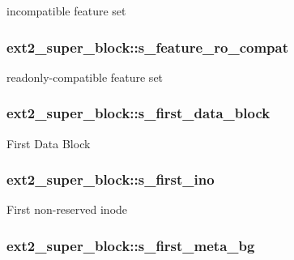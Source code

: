 incompatible feature set \hypertarget{structext2__super__block_a9c63e7954f0344d3de19aad4099d84c7}{
\subsubsection[{s\-\_\-feature\-\_\-ro\-\_\-compat}]{ ext2\-\_\-super\-\_\-block\-::s\-\_\-feature\-\_\-ro\-\_\-compat}}\label{structext2__super__block_a9c63e7954f0344d3de19aad4099d84c7}
readonly-\/compatible feature set \hypertarget{structext2__super__block_ab7c5dfba6eafbb1974f7628d4ae32601}{
\subsubsection[{s\-\_\-first\-\_\-data\-\_\-block}]{ ext2\-\_\-super\-\_\-block\-::s\-\_\-first\-\_\-data\-\_\-block}}\label{structext2__super__block_ab7c5dfba6eafbb1974f7628d4ae32601}
First Data Block \hypertarget{structext2__super__block_a0d3a8f3c14e0a971750cfdfbc2cf6070}{
\subsubsection[{s\-\_\-first\-\_\-ino}]{ ext2\-\_\-super\-\_\-block\-::s\-\_\-first\-\_\-ino}}\label{structext2__super__block_a0d3a8f3c14e0a971750cfdfbc2cf6070}
First non-\/reserved inode \hypertarget{structext2__super__block_a436c7c8af548ade7f8045e88c2861d61}{
\subsubsection[{s\-\_\-first\-\_\-meta\-\_\-bg}]{ ext2\-\_\-super\-\_\-block\-::s\-\_\-first\-\_\-meta\-\_\-bg}}\label{structext2__super__block_a436c7c8af548ade7f8045e88c2861d61}
